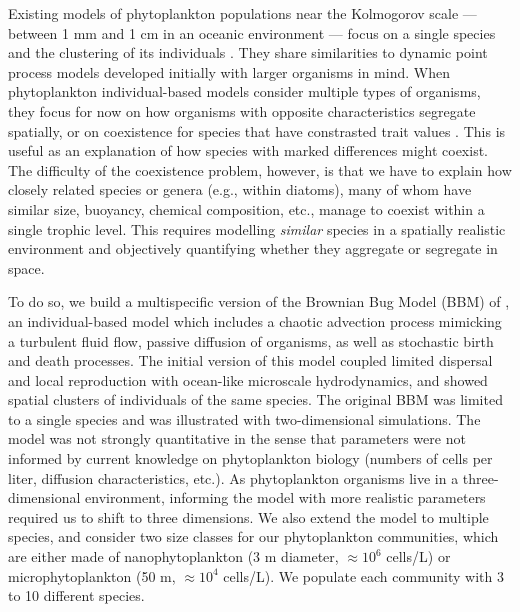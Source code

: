 \documentclass[english]{article}
\begin{document}
Existing models of phytoplankton populations near the Kolmogorov scale
--- between 1 mm and 1 cm in an oceanic environment \citep{barton_impact_2014}
--- focus on a single species and the clustering of its individuals
\citep{young_reproductive_2001,birch_master_2006,bouderbala_3d_2018,breier_emergence_2018}.
They share similarities to dynamic point process models \citep{law_population_2003,bolker_spatial_1999,plank_spatial_2015}
developed initially with larger organisms in mind. When phytoplankton
individual-based models consider multiple types of organisms, they
focus for now on how organisms with opposite characteristics \citep[e.g., increase versus decrease in density with turbulence in][]{borgnino_turbulence_2019,arrieta_fate_2020}
segregate spatially, or on coexistence for species that have constrasted
trait values \citep[e.g., size in][]{benczik_coexistence_2006}. This
is useful as an explanation of how species with marked differences
might coexist. The difficulty of the coexistence problem, however,
is that we have to explain how closely related species or genera (e.g.,
within diatoms), many of whom have similar size, buoyancy, chemical
composition, etc., manage to coexist within a single trophic level.
This requires modelling \emph{similar} species in a spatially realistic
environment and objectively quantifying whether they aggregate or
segregate in space. 

To do so, we build a multispecific version of the Brownian Bug Model
(BBM) of \citet{young_reproductive_2001}, an individual-based model
which includes a chaotic advection process mimicking a turbulent fluid
flow, passive diffusion of organisms, as well as stochastic birth
and death processes. The initial version of this model \citep{young_reproductive_2001}
coupled limited dispersal and local reproduction with ocean-like microscale
hydrodynamics, and showed spatial clusters of individuals of the same
species. The original BBM was limited to a single species and was
illustrated with two-dimensional simulations. The model was not strongly
quantitative \citep{picoche_rescience_2022} in the sense that parameters
were not informed by current knowledge on phytoplankton biology (numbers
of cells per liter, diffusion characteristics, etc.). As phytoplankton
organisms live in a three-dimensional environment, informing the model
with more realistic parameters required us to shift to three dimensions.
We also extend the model to multiple species, and consider two size
classes for our phytoplankton communities, which are either made of
nanophytoplankton (3 \textmu m diameter, $\approx10^{6}$ cells/L)
or microphytoplankton (50 \textmu m, $\approx10^{4}$ cells/L). We
populate each community with 3 to 10 different species.
\end{document}
